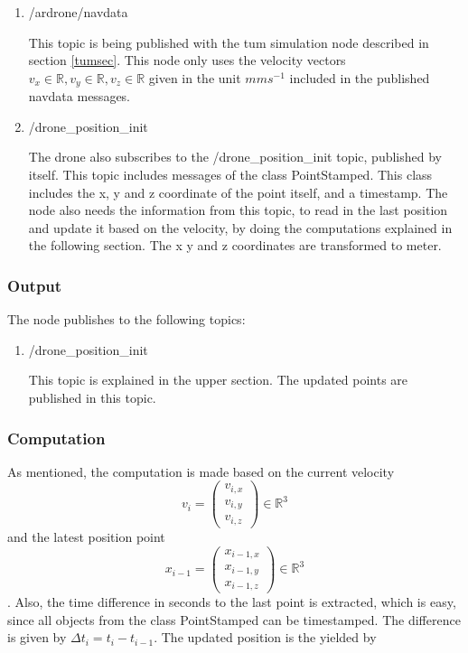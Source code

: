 	\begin{enumerate}
	\item{/ardrone/navdata}
	
	This topic is being published with the tum simulation node described in section \ref{tumsec}.
	This node only uses the velocity vectors
	$v_x \in \mathbb{R}, v_y \in \mathbb{R}, v_z \in \mathbb{R}$ given in the unit $mms^{-1}$ included in the published navdata messages. 
	
	\item{/drone\_position\_init}
	
	The drone also subscribes to the /drone\_position\_init topic, published by itself. This topic includes messages of the class PointStamped. 
	This class includes the x, y and z coordinate of the point itself, and a timestamp.  
	The node also needs the information from this topic, 
	to read in the last position and update it based on the velocity, by doing the computations explained in the following section. The x y and z 
	coordinates are transformed to meter. 
	\end{enumerate}
	
	\subsubsection{Output}
	
	The node publishes to the following topics:
	
	\begin{enumerate}
	\item{/drone\_position\_init}
	
	This topic is explained in the upper section. The updated points are published in this topic.
	
	\end{enumerate}
	
	\subsubsection{Computation}
	
	As mentioned, the computation is made based on the current velocity $$v_i = \begin{pmatrix} v_{i,x} \\ v_{i,y} \\ v_{i,z} \end{pmatrix} \in \mathbb{R}^3$$ and the 
	latest position point $$x_{i-1} = \begin{pmatrix} x_{i-1,x} \\ x_{i-1,y} \\ x_{i-1, z} \end{pmatrix} \in \mathbb{R}^3$$. Also, the time difference 
	in seconds to the last point is extracted, which is easy, since all objects from the class PointStamped can be timestamped. The difference is given by 
	$\Delta t_i =  t_i - t_{i-1}$. The updated position is the yielded by
	
